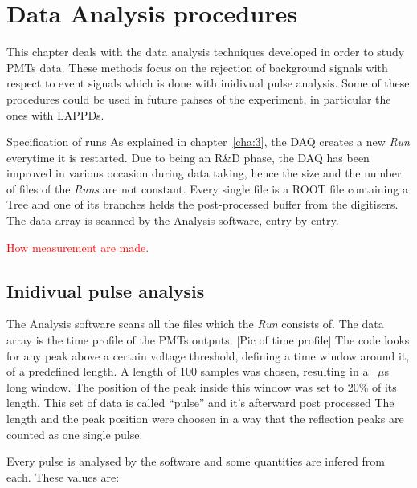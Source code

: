 
\chapter[Analaysis procedures]{Data Analysis procedures}
\label{cha:4}
This chapter deals with the data analysis techniques developed in order to study PMTs data.
These methods focus on the rejection of background signals with respect to event signals which is %
done with inidivual pulse analysis.
Some of these procedures could be used in future pahses of the experiment, in particular %
the ones with LAPPDs.

Specification of runs
As explained in chapter~\ref{cha:3}, the DAQ creates a new \emph{Run} everytime it is restarted.
Due to being an R\&D phase, the DAQ has been improved in various occasion during data taking, %
hence the size and the number of files of the \emph{Runs} are not constant.
Every single file is a ROOT file containing a Tree and one of its branches helds the post-processed %
buffer from the digitisers.
The data array is scanned by the Analysis software, entry by entry.

\textcolor{red}{How measurement are made.}

\section{Inidivual pulse analysis}

The Analysis software scans all the files which the \emph{Run} consists of.
The data array is the time profile of the PMTs outputs.
[Pic of time profile]
The code looks for any peak above a certain voltage threshold, defining a time window %
around it, of a predefined length.
A length of 100 samples was chosen, resulting in a ~$\mu$s long window.
The position of the peak inside this window was set to 20\% of its length.
This set of data is called ``pulse'' and it's afterward post processed
The length and the peak position were choosen in a way that the reflection peaks are counted as %
one single pulse.

Every pulse is analysed by the software and some quantities are infered from each.
These values are:

